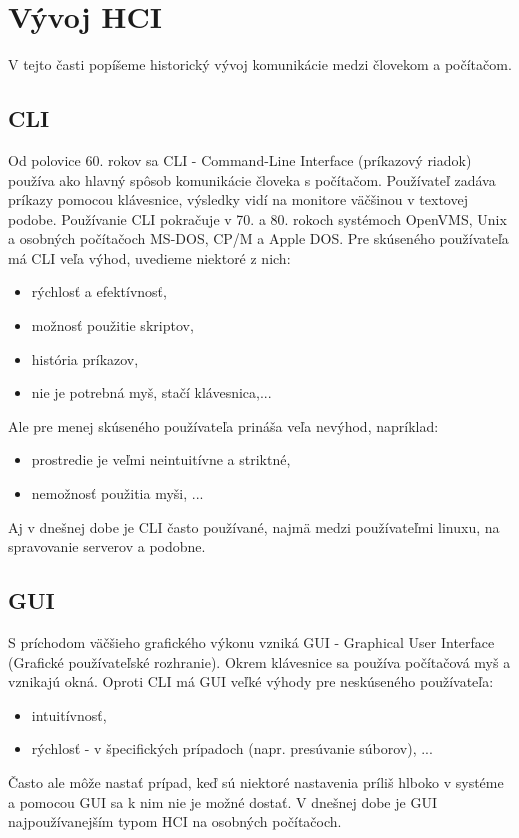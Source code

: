 \section{Vývoj HCI}
V tejto časti popíšeme historický vývoj komunikácie medzi človekom a počítačom.

\subsection{CLI}
Od polovice 60. rokov sa CLI - Command-Line Interface (príkazový riadok) používa ako hlavný spôsob komunikácie človeka s počítačom.
Používateľ zadáva príkazy pomocou klávesnice, výsledky vidí na monitore väčšinou v textovej podobe.
Používanie CLI pokračuje v 70. a 80. rokoch systémoch OpenVMS, Unix a osobných počítačoch MS-DOS, CP/M a Apple DOS.
Pre skúseného používateľa má CLI veľa výhod, uvedieme niektoré z nich:
\begin{itemize}
	\item rýchlosť a efektívnosť,
	\item možnosť použitie skriptov,
	\item história príkazov,
	\item nie je potrebná myš, stačí klávesnica,...
\end{itemize}
Ale pre menej skúseného používateľa prináša veľa nevýhod, napríklad:
\begin{itemize}
	\item prostredie je veľmi neintuitívne a striktné,
	\item nemožnosť použitia myši, ...
\end{itemize}
Aj v dnešnej dobe je CLI často používané, najmä medzi používateľmi linuxu, na spravovanie serverov a podobne.

\subsection{GUI}
S príchodom väčšieho grafického výkonu vzniká GUI - Graphical User Interface (Grafické používateľské rozhranie). 
Okrem klávesnice sa používa počítačová myš a vznikajú okná.
Oproti CLI má GUI veľké výhody pre neskúseného používateľa:
\begin{itemize}
	\item intuitívnosť,
	\item rýchlosť - v špecifických prípadoch (napr. presúvanie súborov), ...
\end{itemize}
Často ale môže nastať prípad, keď sú niektoré nastavenia príliš hlboko v systéme a pomocou GUI sa k nim nie je možné dostať.
V dnešnej dobe je GUI najpoužívanejším typom HCI na osobných počítačoch.

